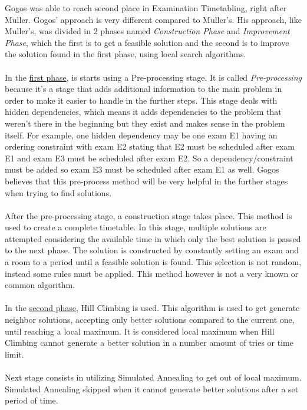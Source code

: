 Gogos was able to reach second place in Examination Timetabling, right after Muller. Gogos' approach is very different compared to Muller's. His approach, like Muller's, was divided in 2 phases named \textit{Construction Phase} and \textit{Improvement Phase}, which the first is to get a feasible solution and the second is to improve the solution found in the first phase, using local search algorithms.\\
\\
In the \underline{first phase}, is starts using a Pre-processing stage. It is called \textit{Pre-processing} because it's a stage that adds additional information to the main problem in order to make it easier to handle in the further steps. This stage deals with hidden dependencies, which means it adds dependencies to the problem that weren't there in the beginning but they exist and makes sense in the problem itself. For example, one hidden dependency may be one exam E1 having an ordering constraint with exam E2 stating that E2 must be scheduled after exam E1 and exam E3 must be scheduled after exam E2. So a dependency/constraint must be added so exam E3 must be scheduled after exam E1 as well. Gogos believes that this pre-process method will be very helpful in the further stages when trying to find solutions.\\
\\
After the pre-processing stage, a construction stage takes place. This method is used to create a complete timetable. In this stage, multiple solutions are attempted considering the available time in which only the best solution is passed to the next phase. The solution is constructed by constantly setting an exam and a room to a period until a feasible solution is found. This selection is not random, instead some rules must be applied. This method however is not a very known or common algorithm.\\
\\
In the \underline{second phase}, Hill Climbing is used. This algorithm is used to get generate neighbor solutions, accepting only better solutions compared to the current one, until reaching a local maximum. It is considered local maximum when Hill Climbing cannot generate a better solution in a number amount of tries or time limit.\\
\\
Next stage consists in utilizing Simulated Annealing to get out of local maximum. Simulated Annealing skipped when it cannot generate better solutions after a set period of time.\\
